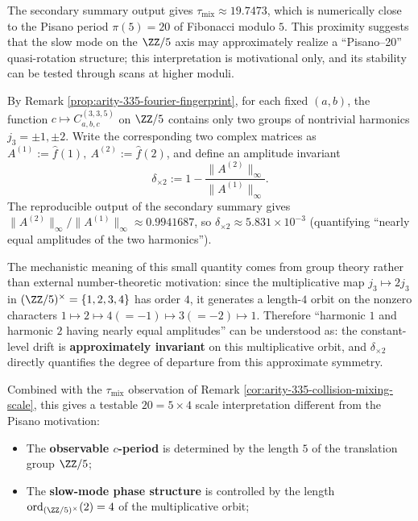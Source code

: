 \begin{remark}\label{rem:arity-335-pisano}
The secondary summary output gives
\(
\tau_{\mathrm{mix}}\approx 19.7473
\), which is numerically close to the Pisano period $\pi(5)=20$ of Fibonacci modulo $5$. This proximity suggests that the slow mode on the $\ZZ/5$ axis may approximately realize a ``Pisano--20'' quasi-rotation structure; this interpretation is motivational only, and its stability can be tested through scans at higher moduli.
\end{remark}

\begin{remark}\label{rem:arity-335-mult-orbit-20-scale}
By Remark \ref{prop:arity-335-fourier-fingerprint}, for each fixed \((a,b)\), the function \(c\mapsto C^{(3,3,5)}_{a,b,c}\) on \(\ZZ/5\) contains only two groups of nontrivial harmonics \(j_3=\pm 1,\pm 2\).
Write the corresponding two complex matrices as
\(
A^{(1)}:=\widehat f(1),\ A^{(2)}:=\widehat f(2)
\), and define an amplitude invariant
\[
\delta_{\times 2}
:=
1-\frac{\|A^{(2)}\|_\infty}{\|A^{(1)}\|_\infty}.
\]
The reproducible output of the secondary summary gives
\(
\|A^{(2)}\|_\infty/\|A^{(1)}\|_\infty\approx 0.9941687
\), so \(\delta_{\times 2}\approx 5.831\times 10^{-3}\) (quantifying ``nearly equal amplitudes of the two harmonics'').
\par
The mechanistic meaning of this small quantity comes from group theory rather than external number-theoretic motivation: since the multiplicative map \(j_3\mapsto 2j_3\) in \((\ZZ/5)^\times=\{1,2,3,4\}\) has order \(4\), it generates a length-\(4\) orbit on the nonzero characters
\(
1\mapsto 2\mapsto 4(=-1)\mapsto 3(=-2)\mapsto 1
\).
Therefore ``harmonic \(1\) and harmonic \(2\) having nearly equal amplitudes'' can be understood as: the constant-level drift is \textbf{approximately invariant} on this multiplicative orbit, and \(\delta_{\times 2}\) directly quantifies the degree of departure from this approximate symmetry.
\par
Combined with the \(\tau_{\mathrm{mix}}\) observation of Remark \ref{cor:arity-335-collision-mixing-scale}, this gives a testable \(20=5\times 4\) scale interpretation different from the Pisano motivation:
\begin{itemize}
  \item The \textbf{observable \(c\)-period} is determined by the length \(5\) of the translation group \(\ZZ/5\);
  \item The \textbf{slow-mode phase structure} is controlled by the length \(\mathrm{ord}_{(\ZZ/5)^\times}(2)=4\) of the multiplicative orbit;

\end{itemize}
\end{remark}
